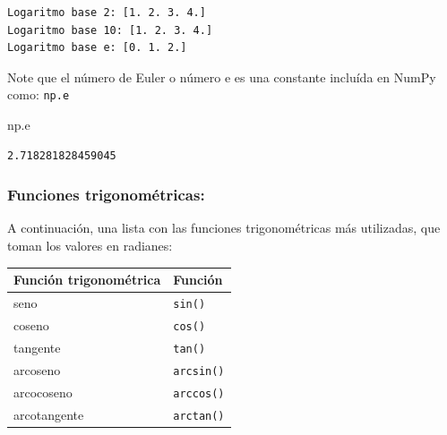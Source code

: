 \documentclass[
  letterpaper,
  DIV=11,
  numbers=noendperiod]{scrreprt}
\newenvironment{Shaded}{\begin{snugshade}}{\end{snugshade}}
\newcommand{\NormalTok}[1]{\textcolor[rgb]{0.00,0.23,0.31}{#1}}
\begin{document}
\begin{verbatim}
Logaritmo base 2: [1. 2. 3. 4.]
Logaritmo base 10: [1. 2. 3. 4.]
Logaritmo base e: [0. 1. 2.]
\end{verbatim}

\begin{tcolorbox}[enhanced jigsaw, bottomrule=.15mm, leftrule=.75mm, opacityback=0, colback=white, toprule=.15mm, bottomtitle=1mm, opacitybacktitle=0.6, rightrule=.15mm, left=2mm, arc=.35mm, coltitle=black, title=\textcolor{quarto-callout-note-color}{\faInfo}\hspace{0.5em}{Note}, breakable, toptitle=1mm, colframe=quarto-callout-note-color-frame, titlerule=0mm, colbacktitle=quarto-callout-note-color!10!white]

Note que el número de Euler o número e es una constante incluída en
NumPy como: \texttt{np.e}

\end{tcolorbox}

\begin{Shaded}
\begin{Highlighting}[]
\NormalTok{np.e}
\end{Highlighting}
\end{Shaded}

\begin{verbatim}
2.718281828459045
\end{verbatim}

\subsubsection{Funciones
trigonométricas:}\label{funciones-trigonomuxe9tricas}

A continuación, una lista con las funciones trigonométricas más
utilizadas, que toman los valores en radianes:

\begin{longtable}[]{@{}ll@{}}
\toprule\noalign{}
Función trigonométrica & Función \\
\midrule\noalign{}
\endhead
\bottomrule\noalign{}
\endlastfoot
seno & \texttt{sin()} \\
coseno & \texttt{cos()} \\
tangente & \texttt{tan()} \\
arcoseno & \texttt{arcsin()} \\
arcocoseno & \texttt{arccos()} \\
arcotangente & \texttt{arctan()} \\
\end{longtable}
\end{document}
